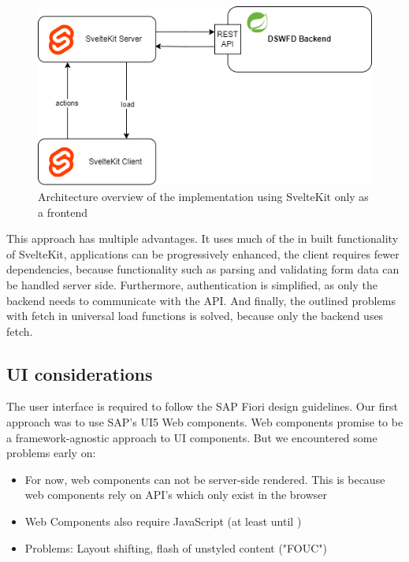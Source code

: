 \begin{figure}[ht]
    \centering
    \includegraphics[width=.6\linewidth]{assets/fe-only-all-server}
    \caption{Architecture overview of the implementation using SvelteKit only as a frontend}
    \label{fig:dswfd-architecture-fe-through-server}
\end{figure}

This approach has multiple advantages. It uses much of the in built functionality of SvelteKit, applications can be progressively enhanced, the client requires fewer dependencies, because functionality such as parsing and validating form data can be handled server side. Furthermore, authentication is simplified, as only the backend needs to communicate with the API. And finally, the outlined problems with fetch in universal load functions is solved, because only the backend uses fetch.


\subsection{UI considerations}

The user interface is required to follow the SAP Fiori design guidelines. Our first approach was to use SAP's UI5 Web components. Web components promise to be a framework-agnostic approach to UI components. But we encountered some problems early on:

\begin{itemize}
    \item For now, web components can not be server-side rendered. This is because web components rely on API's which only exist in the browser
    \item Web Components also require JavaScript (at least until \cite{noauthor_declarative_2023})
    \item Problems: Layout shifting, flash of unstyled content ("FOUC")
\end{itemize}
